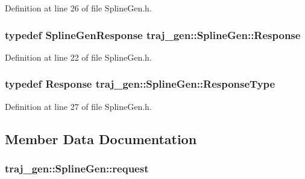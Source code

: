 Definition at line 26 of file Spline\+Gen.\+h.

\subsubsection[{\texorpdfstring{Response}{Response}}]{\setlength{\rightskip}{0pt plus 5cm}typedef {\bf Spline\+Gen\+Response} {\bf traj\+\_\+gen\+::\+Spline\+Gen\+::\+Response}}\hypertarget{structtraj__gen_1_1_spline_gen_ab9c7eb3601b97640e160b4b49722c069}{}\label{structtraj__gen_1_1_spline_gen_ab9c7eb3601b97640e160b4b49722c069}


Definition at line 22 of file Spline\+Gen.\+h.

\subsubsection[{\texorpdfstring{Response\+Type}{ResponseType}}]{\setlength{\rightskip}{0pt plus 5cm}typedef {\bf Response} {\bf traj\+\_\+gen\+::\+Spline\+Gen\+::\+Response\+Type}}\hypertarget{structtraj__gen_1_1_spline_gen_aa671e3204a54f89c4ebc66ed73ee89ab}{}\label{structtraj__gen_1_1_spline_gen_aa671e3204a54f89c4ebc66ed73ee89ab}


Definition at line 27 of file Spline\+Gen.\+h.



\subsection{Member Data Documentation}
\subsubsection[{\texorpdfstring{request}{request}}]{ traj\+\_\+gen\+::\+Spline\+Gen\+::request}\hypertarget{structtraj__gen_1_1_spline_gen_ab08d03a5f1341e017a4af0b6b79280a9}{}\label{structtraj__gen_1_1_spline_gen_ab08d03a5f1341e017a4af0b6b79280a9}


